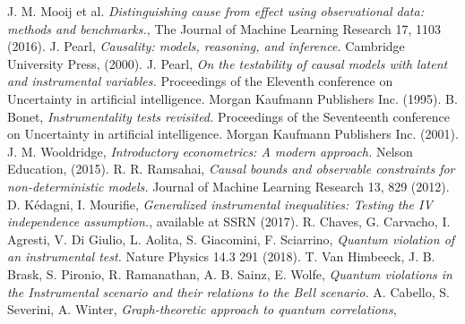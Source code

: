 \documentclass[letterpaper]{article}
\begin{document}

\begin{thebibliography}{}
 J. M. Mooij et al. {\em Distinguishing cause from effect using observational data: methods and benchmarks.}, The Journal of Machine Learning Research 17, 1103 (2016).
     J. Pearl, 
        {\em Causality: models, reasoning, and inference.}
        Cambridge University Press, (2000).
     J. Pearl, 
        {\em On the testability of causal models with latent and instrumental variables.}
        Proceedings of the Eleventh conference on Uncertainty in artificial
        intelligence. Morgan Kaufmann Publishers Inc. (1995).
     B. Bonet, {\em Instrumentality tests revisited.}
        Proceedings of the Seventeenth conference on Uncertainty in artificial
        intelligence. Morgan Kaufmann Publishers Inc. (2001).
     J. M. Wooldridge, 
        {\em Introductory econometrics: A modern approach.} 
        Nelson Education, (2015).
     R. R. Ramsahai, 
        {\em Causal bounds and observable constraints for non-deterministic models.}
        Journal of Machine Learning Research 13, 829 (2012).
      D. Kédagni, I. Mourifie, 
        {\em Generalized instrumental inequalities: Testing the IV independence assumption.}, available at SSRN (2017).
     R. Chaves, G. Carvacho, I. Agresti, V. Di Giulio, L. Aolita,
        S. Giacomini, F. Sciarrino, 
        {\em Quantum violation of an instrumental test.} 
        Nature Physics 14.3 291 (2018).
      T. Van Himbeeck, J. B. Brask, S. Pironio, R. Ramanathan, A. B. Sainz, E. Wolfe, 
        {\em Quantum violations in the Instrumental scenario and their relations to the Bell scenario.}
      A. Cabello, S. Severini, A. Winter,
         {\em Graph-theoretic approach to quantum correlations}, 

\end{thebibliography}
\end{document}

